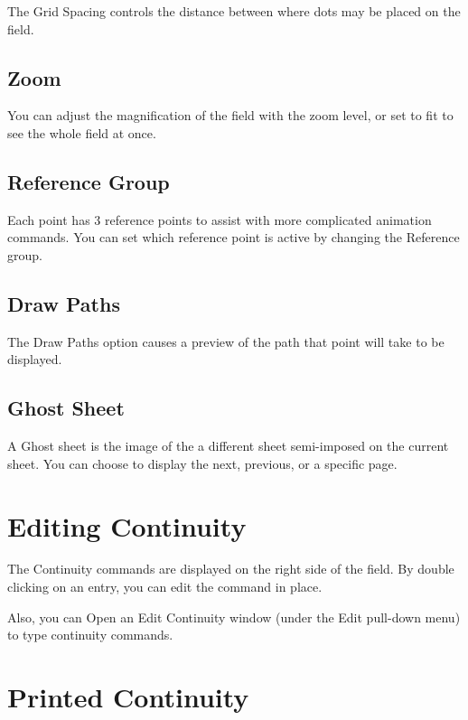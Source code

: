 The Grid Spacing controls the distance between where dots may be placed on the field.

\subsection{Zoom}\label{zoomlevel}

You can adjust the magnification of the field with the zoom level, or set to fit to see the 
whole field at once.

\subsection{Reference Group}\label{referencegroup}

Each point has 3 reference points to assist with more complicated animation commands.  You can set which
reference point is active by changing the Reference group.

\subsection{Draw Paths}\label{drawpaths}

The Draw Paths option causes a preview of the path that point will take to be displayed. 

\subsection{Ghost Sheet}\label{ghostsheet}

A Ghost sheet is the image of the a different sheet semi-imposed on the current sheet.
You can choose to display the next, previous, or a specific page.

\section{Editing Continuity}\label{editcont}

The Continuity commands are displayed on the right side of the field.  By double clicking on an entry, you can
edit the command in place.

Also, you can Open an Edit Continuity window (under the Edit pull-down menu) to type
continuity commands.

\section{Printed Continuity}\label{printcont}

